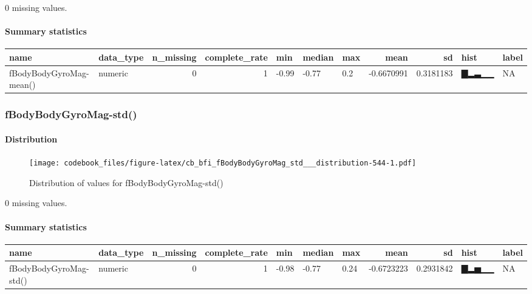\documentclass[
]{article}
\begin{document}
0 missing values.

\hypertarget{fBodyBodyGyroMag_mean___summary}{%
\paragraph{Summary statistics}\label{fBodyBodyGyroMag_mean___summary}}

\begin{longtable}[]{@{}llrrlllrrll@{}}
\toprule
name & data\_type & n\_missing & complete\_rate & min & median & max &
mean & sd & hist & label \\
\midrule
\endhead
fBodyBodyGyroMag-mean() & numeric & 0 & 1 & -0.99 & -0.77 & 0.2 &
-0.6670991 & 0.3181183 & ▇▂▃▁▁ & NA \\
\bottomrule
\end{longtable}

\hypertarget{fBodyBodyGyroMag_std__}{%
\subsubsection{fBodyBodyGyroMag-std()}\label{fBodyBodyGyroMag_std__}}

\hypertarget{fBodyBodyGyroMag_std___distribution}{%
\paragraph{Distribution}\label{fBodyBodyGyroMag_std___distribution}}

\begin{figure}
\centering
\texttt{[image: codebook\_files/figure-latex/cb\_bfi\_fBodyBodyGyroMag\_std\_\_\_distribution-544-1.pdf]}
\caption{Distribution of values for fBodyBodyGyroMag-std()}
\end{figure}

0 missing values.

\hypertarget{fBodyBodyGyroMag_std___summary}{%
\paragraph{Summary statistics}\label{fBodyBodyGyroMag_std___summary}}

\begin{longtable}[]{@{}llrrlllrrll@{}}
\toprule
name & data\_type & n\_missing & complete\_rate & min & median & max &
mean & sd & hist & label \\
\midrule
\endhead
fBodyBodyGyroMag-std() & numeric & 0 & 1 & -0.98 & -0.77 & 0.24 &
-0.6723223 & 0.2931842 & ▇▂▅▁▁ & NA \\
\bottomrule
\end{longtable}
\end{document}
